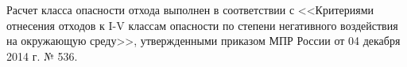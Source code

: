Расчет класса опасности отхода выполнен в соответствии с 
<<Критериями отнесения отходов к I-V классам опасности по степени негативного воздействия на окружающую среду>>, 
утвержденными приказом МПР России от 04 декабря 2014 г. № 536.

\bigskip

\noindent
